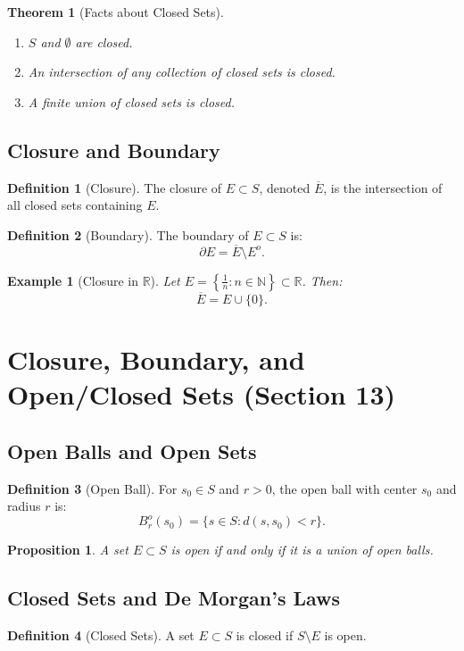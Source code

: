 \documentclass[9pt]{article}
\theoremstyle{definition}
\newtheorem{definition}{Definition}
\theoremstyle{plain}
\newtheorem{theorem}{Theorem}
\newtheorem{proposition}{Proposition}
\newtheorem{example}{Example}
\begin{document}
\begin{theorem}[Facts about Closed Sets]
\leavevmode
\begin{enumerate}
    \item \( S \) and \( \emptyset \) are closed.
    \item An intersection of any collection of closed sets is closed.
    \item A finite union of closed sets is closed.
\end{enumerate}
\end{theorem}

\subsection*{Closure and Boundary}
\begin{definition}[Closure]
The closure of \( E \subset S \), denoted \( \overline{E} \), is the intersection of all closed sets containing \( E \).
\end{definition}

\begin{definition}[Boundary]
The boundary of \( E \subset S \) is:
\[
\partial E = \overline{E} \setminus E^o.
\]
\end{definition}

\begin{example}[Closure in \( \mathbb{R} \)]
Let \( E = \left\{\frac{1}{n} : n \in \mathbb{N}\right\} \subset \mathbb{R} \). Then:
\[
\overline{E} = E \cup \{0\}.
\]
\end{example}
\section*{Closure, Boundary, and Open/Closed Sets (Section 13)}

\subsection*{Open Balls and Open Sets}
\begin{definition}[Open Ball]
For \( s_0 \in S \) and \( r > 0 \), the open ball with center \( s_0 \) and radius \( r \) is:
\[
B_r^o(s_0) = \{s \in S : d(s, s_0) < r\}.
\]
\end{definition}

\begin{proposition}
A set \( E \subset S \) is open if and only if it is a union of open balls.
\end{proposition}

\subsection*{Closed Sets and De Morgan's Laws}
\begin{definition}[Closed Sets]
A set \( E \subset S \) is closed if \( S \setminus E \) is open.
\end{definition}
\end{document}
